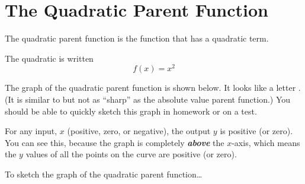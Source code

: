 


\section*{The Quadratic Parent Function}

The quadratic parent function is the  function that has a quadratic term.

\begin{center}
    \begin{tcolorbox}[width=5in]
        The quadratic  is written
        \[
            f(x) = x^2
        \]
    \end{tcolorbox}
\end{center}








The graph of the quadratic parent function is shown below.
It looks like a letter .
(It is similar to but not as ``sharp'' as the absolute value parent function.)
You should be able to quickly sketch this graph in homework or on a test.

\begin{center}
\end{center}


For any input, $x$ (positive, zero, or negative), the output $y$ is positive (or zero). 
You can see this, because the graph is completely {\bfseries\itshape above} the $x$-axis,
which means the $y$ values of all the points on the curve are positive (or zero).

\begin{myConceptSteps}{To sketch the graph of the quadratic parent function\dots}
\end{myConceptSteps}


